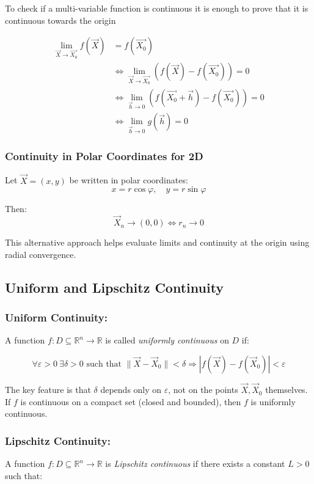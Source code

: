 To check if a multi-variable function is continuous it is enough to prove that it is continuous towards the origin

\begin{align*}
    \lim_{\vec{X} \to \vec{X_0}}f(\vec{X}) &= f(\vec{X_0}) \\
    &\iff \lim_{\vec{X} \to \vec{X_0}} \left(f(\vec{X}) - f(\vec{X_0})\right) = 0 \\
    &\iff \lim_{\vec{h} \to 0} \left(f(\vec{X_0} + \vec{h}) - f(\vec{X_0})\right) = 0 \\
    &\iff \lim_{\vec{h} \to 0} g(\vec{h}) = 0
\end{align*}

\subsubsection{Continuity in Polar Coordinates for 2D}

Let \( \vec{X} = (x, y) \) be written in polar coordinates:
\[
x = r \cos \varphi, \quad y = r \sin \varphi
\]

Then:
\[
\vec{X}_n \to (0, 0) \iff r_n \to 0
\]

This alternative approach helps evaluate limits and continuity at the origin using radial convergence.

\subsection{Uniform and Lipschitz Continuity}

\subsubsection{Uniform Continuity:}  
A function \( f : D \subseteq \mathbb{R}^n \to \mathbb{R} \) is called \emph{uniformly continuous} on \( D \) if:

\[
\forall \varepsilon > 0 \ \exists \delta > 0 \text{ such that } \|\vec{X} - \vec{X}_0\| < \delta \Rightarrow |f(\vec{X}) - f(\vec{X}_0)| < \varepsilon
\]

The key feature is that \( \delta \) depends only on \( \varepsilon \), not on the points \( \vec{X}, \vec{X}_0 \) themselves.  
If \( f \) is continuous on a compact set (closed and bounded), then \( f \) is uniformly continuous.

\subsubsection{Lipschitz Continuity:}  
A function \( f : D \subseteq \mathbb{R}^n \to \mathbb{R} \) is \emph{Lipschitz continuous} if there exists a constant \( L > 0 \) such that:

